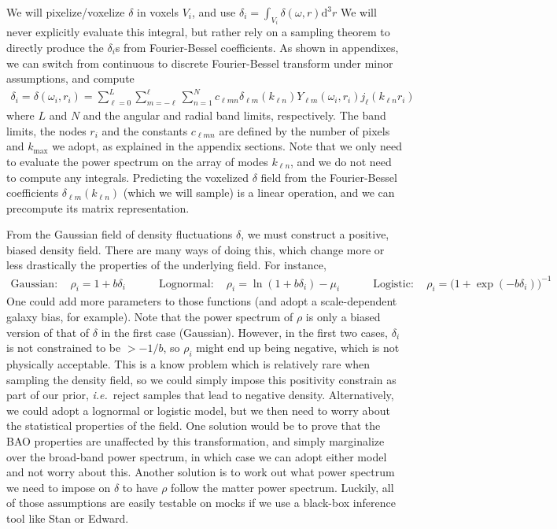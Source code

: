 \documentclass{aastex6}
\newcommand{\ie}{{\textit{i.e.}~}}
\renewcommand{\d}{{\mathrm{d}}}
\newcommand{\eqn}[1]{\begin{eqnarray}#1\end{eqnarray}}
\begin{document}
We will pixelize/voxelize $\delta$ in voxels $V_i$, and use $\delta_i=\int_{V_i} \delta(\omega, r) \d^3r$
We will never explicitly evaluate this integral, but rather rely on a sampling theorem to directly produce the $\delta_i$s from Fourier-Bessel coefficients.
As shown in appendixes, we can switch from continuous to discrete Fourier-Bessel transform under minor assumptions, and compute 
\eqn{
	\delta_i = \delta(\omega_i, r_i) = \sum_{\ell = 0}^L \sum_{m = -\ell}^\ell \sum_{n = 1}^N c_{\ell m n} \delta_{\ell m}(k_{\ell n}) Y_{\ell m}(\omega_i, r_i) j_\ell(k_{\ell n} r_i)
}
where $L$ and $N$ and the angular and radial band limits, respectively.
The band limits, the nodes $r_i$ and the constants $c_{\ell m n}$ are defined by the number of pixels and $k_\mathrm{max}$ we adopt, as explained in the appendix sections.
Note that we only need to evaluate the power spectrum on the array of modes $k_{\ell n}$, and we do not need to compute any integrals.
Predicting the voxelized $\delta$ field from the Fourier-Bessel coefficients $ \delta_{\ell m}(k_{\ell n}) $ (which we will sample) is a linear operation, and we can precompute its matrix representation.

From the Gaussian field of density fluctuations $\delta$, we must construct a positive, biased density field. There are many ways of doing this, which change more or less drastically the properties of the underlying field. For instance,
\eqn{
	\mathrm{Gaussian:}\quad 	\rho_i = 1 + b \delta_i \quad\quad\quad
	\mathrm{Lognormal:}\quad	\rho_i = \ln(1 + b \delta_i) - \mu_i\quad\quad\quad
	\mathrm{Logistic:}\quad	\rho_i = \bigl(1 + \exp(-b \delta_i)\bigr)^{-1}
}
One could add more parameters to those functions (and adopt a scale-dependent galaxy bias, for example). 
Note that the power spectrum of $\rho$ is only a biased version of that of $\delta$ in the first case (Gaussian). 
However, in the first two cases, $\delta_i$ is not constrained to be $>-1/b$, so $\rho_i$ might end up being negative, which is not physically acceptable. 
This is a know problem which is relatively rare when sampling the density field, so we could simply impose this positivity constrain as part of our prior, \ie reject samples that lead to negative density.
Alternatively, we could adopt a lognormal or logistic model, but we then need to worry about the statistical properties of the field.
One solution would be to prove that the BAO properties are unaffected by this transformation, and simply marginalize over the broad-band power spectrum, in which case we can adopt either model and not worry about this.
Another solution is to work out what power spectrum we need to impose on $\delta$ to have $\rho$ follow the matter power spectrum.
Luckily, all of those assumptions are easily testable on mocks if we use a black-box inference tool like Stan or Edward.
\end{document}
